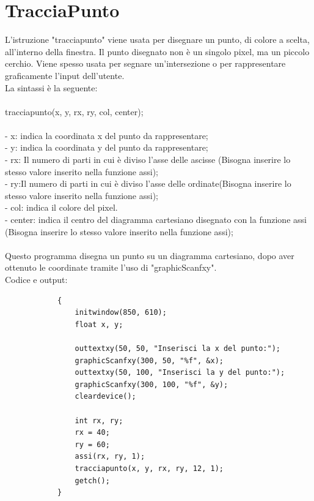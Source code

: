 \documentclass[12pt]{book}
\begin{document}
		\section{TracciaPunto}
			L'istruzione "tracciapunto" viene usata per disegnare un punto, di colore a scelta, all'interno della finestra. Il punto disegnato non è un singolo pixel, ma un piccolo cerchio. Viene  spesso usata per segnare un'intersezione o per rappresentare graficamente l'input dell'utente.
		\\La sintassi è la seguente:
		\\
		\\
		\Large tracciapunto(x, y, rx, ry, col, center);
		\normalsize
		\\
		\\- x: indica la coordinata x del punto da rappresentare;
		\\- y: indica la coordinata y del punto da rappresentare;
		\\- rx: Il numero di parti in cui è diviso l'asse delle ascisse (Bisogna inserire lo stesso valore inserito nella funzione assi);
		\\- ry:Il numero di parti in cui è diviso l'asse delle ordinate(Bisogna inserire lo stesso valore inserito nella funzione assi);
		\\- col: indica il colore del pixel.
		\\- center: indica il centro del diagramma cartesiano disegnato con la funzione assi (Bisogna inserire lo stesso valore inserito nella funzione assi);
		\\
		\\Questo programma disegna un punto su un diagramma cartesiano, dopo aver ottenuto le coordinate tramite l'uso di "graphicScanfxy".
		\\
		Codice e output:			
		\begin{lstlisting}
			{
				initwindow(850, 610);
				float x, y;

				outtextxy(50, 50, "Inserisci la x del punto:");
				graphicScanfxy(300, 50, "%f", &x);
				outtextxy(50, 100, "Inserisci la y del punto:");
				graphicScanfxy(300, 100, "%f", &y);
				cleardevice();

				int rx, ry;
				rx = 40;
				ry = 60;
				assi(rx, ry, 1);
				tracciapunto(x, y, rx, ry, 12, 1);
				getch();
			}
		\end{lstlisting}
		
\end{document}
